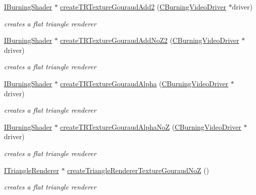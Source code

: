 \begin{DoxyCompactItemize}
\item 
\hyperlink{classirr_1_1video_1_1_i_burning_shader}{I\-Burning\-Shader} $\ast$ \hyperlink{namespaceirr_1_1video_addac86c3cb75e25b676a61ced384fda0}{create\-T\-R\-Texture\-Gouraud\-Add2} (\hyperlink{classirr_1_1video_1_1_c_burning_video_driver}{C\-Burning\-Video\-Driver} $\ast$driver)
\begin{DoxyCompactList}\small\item\em creates a flat triangle renderer \end{DoxyCompactList}\item 
\hyperlink{classirr_1_1video_1_1_i_burning_shader}{I\-Burning\-Shader} $\ast$ \hyperlink{namespaceirr_1_1video_af0201080aa446827370806d2cac4d859}{create\-T\-R\-Texture\-Gouraud\-Add\-No\-Z2} (\hyperlink{classirr_1_1video_1_1_c_burning_video_driver}{C\-Burning\-Video\-Driver} $\ast$driver)
\begin{DoxyCompactList}\small\item\em creates a flat triangle renderer \end{DoxyCompactList}\item 
\hyperlink{classirr_1_1video_1_1_i_burning_shader}{I\-Burning\-Shader} $\ast$ \hyperlink{namespaceirr_1_1video_a3011b69ecdeff157fbbb4bd998190a82}{create\-T\-R\-Texture\-Gouraud\-Alpha} (\hyperlink{classirr_1_1video_1_1_c_burning_video_driver}{C\-Burning\-Video\-Driver} $\ast$driver)
\begin{DoxyCompactList}\small\item\em creates a flat triangle renderer \end{DoxyCompactList}\item 
\hyperlink{classirr_1_1video_1_1_i_burning_shader}{I\-Burning\-Shader} $\ast$ \hyperlink{namespaceirr_1_1video_a86c6358b7488b20803960bb71ecbd1e4}{create\-T\-R\-Texture\-Gouraud\-Alpha\-No\-Z} (\hyperlink{classirr_1_1video_1_1_c_burning_video_driver}{C\-Burning\-Video\-Driver} $\ast$driver)
\begin{DoxyCompactList}\small\item\em creates a flat triangle renderer \end{DoxyCompactList}\item 
\hyperlink{classirr_1_1video_1_1_i_triangle_renderer}{I\-Triangle\-Renderer} $\ast$ \hyperlink{namespaceirr_1_1video_acdadb8a7b60f34ab672f618905636f8a}{create\-Triangle\-Renderer\-Texture\-Gouraud\-No\-Z} ()
\begin{DoxyCompactList}\small\item\em creates a flat triangle renderer \end{DoxyCompactList}\item 

\end{DoxyCompactItemize}
